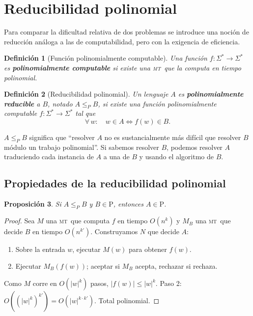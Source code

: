 \documentclass[11pt,a4paper]{article}
\theoremstyle{definicion}
\newtheorem{definicion}{Definici\'on}[section]
\newtheorem{proposicion}[definicion]{Proposici\'on}
\newcommand{\MT}{\textsc{mt}}
\newcommand{\redP}{\leq_{P}}
\newcommand{\Pclass}{\mathrm{P}}
\begin{document}
\section{Reducibilidad polinomial}

Para comparar la dificultad relativa de dos problemas se introduce una noci\'on de reducci\'on an\'aloga a las de computabilidad, pero con la exigencia de eficiencia.

\begin{definicion}[Funci\'on polinomialmente computable]
Una funci\'on $f : \Sigma^* \to \Sigma^*$ es \textbf{polinomialmente computable} si existe una \MT\ que la computa en tiempo polinomial.
\end{definicion}

\begin{definicion}[Reducibilidad polinomial]
Un lenguaje $A$ es \textbf{polinomialmente reducible} a $B$, notado $A \redP B$, si existe una funci\'on polinomialmente computable $f : \Sigma^* \to \Sigma^*$ tal que
\[
\forall\, w : \quad w \in A \iff f(w) \in B.
\]
\end{definicion}

\begin{intuicion}
$A \redP B$ significa que ``resolver $A$ no es sustancialmente m\'as dif\'icil que resolver $B$ m\'odulo un trabajo polinomial''. Si sabemos resolver $B$, podemos resolver $A$ traduciendo cada instancia de $A$ a una de $B$ y usando el algoritmo de $B$.
\end{intuicion}

\subsection{Propiedades de la reducibilidad polinomial}

\begin{proposicion}\label{prop:red-P}
Si $A \redP B$ y $B \in \Pclass$, entonces $A \in \Pclass$.
\end{proposicion}

\begin{proof}
Sea $M$ una \MT\ que computa $f$ en tiempo $O(n^k)$ y $M_B$ una \MT\ que decide $B$ en tiempo $O(n^{k'})$. Construyamos $N$ que decide $A$:
\begin{enumerate}
    \item Sobre la entrada $w$, ejecutar $M(w)$ para obtener $f(w)$.
    \item Ejecutar $M_B(f(w))$; aceptar si $M_B$ acepta, rechazar si rechaza.
\end{enumerate}
Como $M$ corre en $O(|w|^k)$ pasos, $|f(w)| \leq |w|^k$. Paso 2: $O((|w|^k)^{k'}) = O(|w|^{k \cdot k'})$. Total polinomial.
\end{proof}
\end{document}
